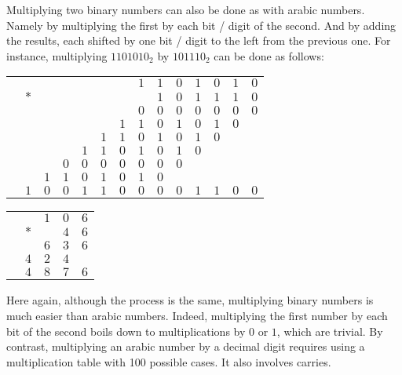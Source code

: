 Multiplying two binary numbers can also be done as with arabic numbers. Namely
by multiplying the first by each bit / digit of the second. And by adding the
results, each shifted by one bit / digit to the left from the previous one. For
instance, multiplying $1101010_2$ by $101110_2$ can be done as follows:

\setlength{\tabcolsep}{1pt}
\begin{center}
  \begin{tabular}{rrrrrrrrrrrrrr}
                        & & & & & & & $1$ & $1$ & $0$ & $1$ & $0$ & $1$ & $0$ \\
                        & $*$ & & & & & & & $1$ & $0$ & $1$ & $1$ & $1$ & $0$ \\
\cline{2-14} \makecell{~}
                        & & & & & & & $0$ & $0$ & $0$ & $0$ & $0$ & $0$ & $0$ \\
                    & & & & & & $1$ & $1$ & $0$ & $1$ & $0$ & $1$ & $0$ & \\
                & & & & & $1$ & $1$ & $0$ & $1$ & $0$ & $1$ & $0$ & & \\
            & & & & $1$ & $1$ & $0$ & $1$ & $0$ & $1$ & $0$ & & & \\
        & & & $0$ & $0$ & $0$ & $0$ & $0$ & $0$ & $0$ & & & & \\
    & & $1$ & $1$ & $0$ & $1$ & $0$ & $1$ & $0$ & & & & & \\
\cline{2-14} \makecell{~}
& $1$ & $0$ & $0$ & $1$ & $1$ & $0$ & $0$ & $0$ & $0$ & $1$ & $1$ & $0$ & $0$
  \end{tabular}
  \hspace{16mm}
  \begin{tabular}{rrrrr}
 &     & $1$ & $0$ & $6$ \\
 & $*$ &     & $4$ & $6$ \\
\cline{2-5} \makecell{~}
 &     & $6$ & $3$ & $6$ \\
 & $4$ & $2$ & $4$ &     \\
\cline{2-5} \makecell{~}
 & $4$ & $8$ & $7$ & $6$
  \end{tabular}
\end{center}
\setlength{\tabcolsep}{\defaulttabcolsep}

Here again, although the process is the same, multiplying binary numbers is
much easier than arabic numbers. Indeed, multiplying the first number by each
bit of the second boils down to multiplications by $0$ or $1$, which are
trivial. By contrast, multiplying an arabic number by a decimal digit requires
using a multiplication table with 100 possible cases. It also involves carries.

